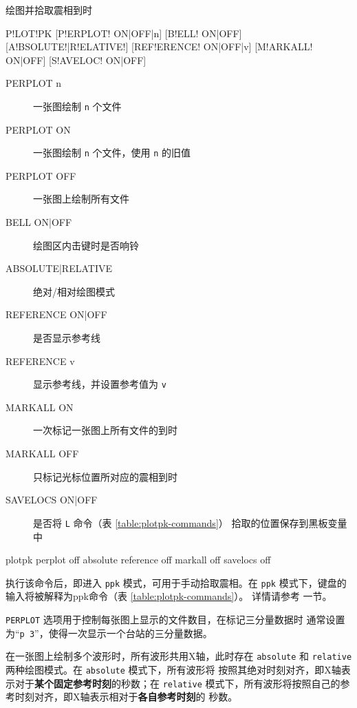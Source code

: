\label{cmd:plotpk}

绘图并拾取震相到时

\begin{SACSTX}
P!LOT!PK [P!ERPLOT! ON|OFF|n] [B!ELL! ON|OFF] [A!BSOLUTE!|R!ELATIVE!]
    [REF!ERENCE! ON|OFF|v] [M!ARKALL! ON|OFF] [S!AVELOC! ON|OFF]
\end{SACSTX}

\begin{description}
\item [PERPLOT n] 一张图绘制 \texttt{n} 个文件
\item [PERPLOT ON] 一张图绘制 \texttt{n} 个文件，使用 \texttt{n} 的旧值
\item [PERPLOT OFF] 一张图上绘制所有文件
\item [BELL ON|OFF] 绘图区内击键时是否响铃
\item [ABSOLUTE|RELATIVE] 绝对/相对绘图模式
\item [REFERENCE ON|OFF] 是否显示参考线
\item [REFERENCE v] 显示参考线，并设置参考值为 \texttt{v}
\item [MARKALL ON] 一次标记一张图上所有文件的到时
\item [MARKALL OFF] 只标记光标位置所对应的震相到时
\item [SAVELOCS ON|OFF] 是否将 \texttt{L} 命令（表 \ref{table:plotpk-commands}）
    拾取的位置保存到黑板变量中
\end{description}

\begin{SACDFT}
plotpk perplot off absolute reference off markall off savelocs off
\end{SACDFT}

执行该命令后，即进入 \texttt{ppk} 模式，可用于手动拾取震相。在 \texttt{ppk}
模式下，键盘的输入将被解释为ppk命令（表 \ref{table:plotpk-commands}）。
详情请参考  一节。

\texttt{PERPLOT} 选项用于控制每张图上显示的文件数目，在标记三分量数据时
通常设置为``\texttt{p 3}''，使得一次显示一个台站的三分量数据。

在一张图上绘制多个波形时，所有波形共用X轴，此时存在 \texttt{absolute} 和
\texttt{relative} 两种绘图模式。在 \texttt{absolute} 模式下，所有波形将
按照其绝对时刻对齐，即X轴表示对于\textbf{某个固定参考时刻}的秒数；在 \texttt{relative}
模式下，所有波形将按照自己的参考时刻对齐，即X轴表示相对于\textbf{各自参考时刻}的
秒数。


